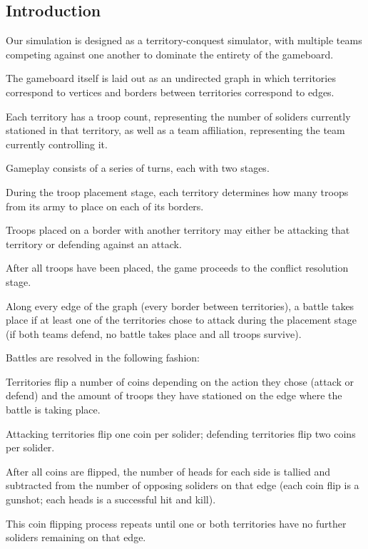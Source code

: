 \documentclass[10pt]{article}
\begin{document}
	\begin{multicols}{2}
		\section*{Introduction}
		
		Our simulation is designed as a territory-conquest simulator, with multiple teams competing against one another to dominate the entirety of the gameboard. 

		The gameboard itself is laid out as an undirected graph in which territories correspond to vertices and borders between territories correspond to edges.

		Each territory has a troop count, representing the number of soliders currently stationed in that territory, as well as a team affiliation, representing the team currently controlling it.

		Gameplay consists of a series of turns, each with two stages. 

		During the troop placement stage, each territory determines how many troops from its army to place on each of its borders.

		Troops placed on a border with another territory may either be attacking that territory or defending against an attack.

		After all troops have been placed, the game proceeds to the conflict resolution stage.

		Along every edge of the graph (every border between territories), a battle takes place if at least one of the territories chose to attack during the placement stage (if both teams defend, no battle takes place and all troops survive).

		Battles are resolved in the following fashion: 

		Territories flip a number of coins depending on the action they chose (attack or defend) and the amount of troops they have stationed on the edge where the battle is taking place. 

		Attacking territories flip one coin per solider; defending territories flip two coins per solider.

		After all coins are flipped, the number of heads for each side is tallied and subtracted from the number of opposing soliders on that edge (each coin flip is a gunshot; each heads is a successful hit and kill).

		This coin flipping process repeats until one or both territories have no further soliders remaining on that edge. 


\end{multicols}
\end{document}
